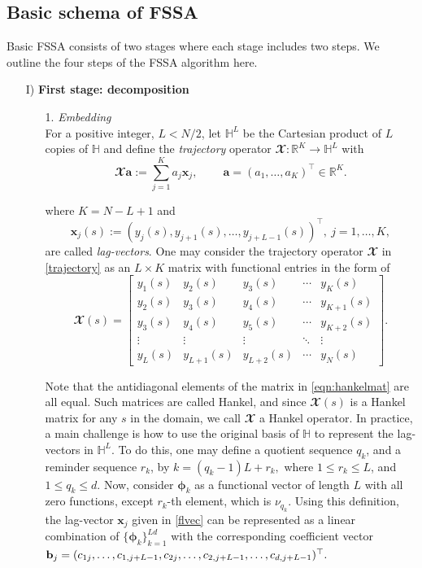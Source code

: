 \subsection{Basic schema of FSSA}
 Basic FSSA consists of two stages where each stage includes two steps. We outline the four steps of the FSSA algorithm here.
\begin{itemize}
\item[I)] \textbf{First stage: decomposition}
\begin{itemize}
\item[1.]  \textit{Embedding} \\ For a positive integer, $L<N/2$, let $\mathbb{H}^L$ be the Cartesian product of $L$ copies of $\mathbb{H}$ and define  the \textit{trajectory} operator $\mathbfcal{X}:\mathbb{R}^{K} \rightarrow \mathbb{H}^{L}$ with
	\begin{equation}\label{trajectory}
		\mathbfcal{X}{\pmb a}:=\sum_{j=1}^K a_j{\pmb x}_j,\qquad
		\ {\pmb a}=\left(a_1,\ldots, a_K\right)^\top \in\mathbb{R}^K.
	\end{equation}
	
	where $K=N-L+1$ and 
	\begin{equation}\label{flvec}
		{\pmb x}_j(s):= \left( y_j(s), y_{j+1}(s), \ldots, y_{j+L-1}(s)\right)^\top,\ j=1,\ldots, K,
	\end{equation}
	are called \textit{lag-vectors}. One may consider the trajectory operator $\mathbfcal{X}$ in \eqref{trajectory} as an $L \times K$ matrix with functional entries in the form of	
	\begin{equation}\label{eqn:hankelmat}
		\mathbfcal{X}(s) = \begin{bmatrix}y_{1}(s) & y_{2}(s) & y_{3}(s) & \cdots & y_{K}(s) \\ y_{2}(s) & y_{3}(s) & y_{4}(s) & \cdots & y_{K+1}(s) \\ y_{3}(s) & y_{4}(s) & y_{5}(s) & \cdots & y_{K+2}(s) \\ \vdots  & \vdots & \vdots & \ddots & \vdots \\ y_{L}(s) & y_{L+1}(s) & y_{L+2}(s) & \cdots & y_{N}(s)  \end{bmatrix}.
	\end{equation}
	
Note that the antidiagonal elements of the matrix in \eqref{eqn:hankelmat} are all equal. Such matrices are called Hankel, and since $\mathbfcal{X}(s)$ is a Hankel matrix for any $s$ in the domain, we call $\mathbfcal{X}$ a Hankel operator. In practice, a main challenge is how to use the original basis of $\mathbb{H}$ to represent the lag-vectors in $\mathbb{H}^L$. To do this, one may define a quotient sequence $q_k$, and a reminder sequence $r_k$, by $k=(q_k-1)L+r_k,$ where $1\leq r_k\leq L$, and $1\leq q_k\leq d$. Now, consider ${\pmb \phi}_{k}$ as a functional vector of length $L$ with all zero functions, except $r_k$-th element, which is $\nu_{q_k}$. Using this definition, the lag-vector ${\pmb{x}_j}$ given in \eqref{flvec} can be represented as a linear combination of $\{{\pmb \phi}_{k}\}_{k=1}^{Ld}$ with the corresponding coefficient vector ${\bf b}_j=(c_{1j},\ldots, c_{1,j+L-1},c_{2j},\ldots,c_{2,j+L-1},\ldots,c_{d,j+L-1} )^\top.$ 
	

\end{itemize}
\end{itemize}
